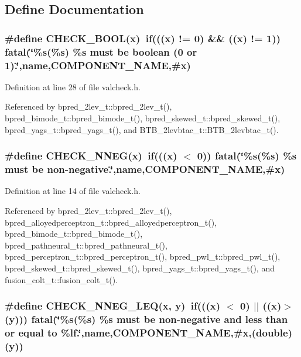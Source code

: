 \subsection{Define Documentation}
\subsubsection[{CHECK\_\-BOOL}]{\setlength{\rightskip}{0pt plus 5cm}\#define CHECK\_\-BOOL(x)~if(((x) != 0) \&\& ((x) != 1)) fatal(\char`\"{}\%s(\%{\bf s}) \%{\bf s} must be boolean (0 or 1).\char`\"{},name,COMPONENT\_\-NAME,\#x)}\label{valcheck_8h_e4da23c2826590bf3f9a30631991112a}




Definition at line 28 of file valcheck.h.

Referenced by bpred\_\-2lev\_\-t::bpred\_\-2lev\_\-t(), bpred\_\-bimode\_\-t::bpred\_\-bimode\_\-t(), bpred\_\-skewed\_\-t::bpred\_\-skewed\_\-t(), bpred\_\-yags\_\-t::bpred\_\-yags\_\-t(), and BTB\_\-2levbtac\_\-t::BTB\_\-2levbtac\_\-t().
\subsubsection[{CHECK\_\-NNEG}]{\setlength{\rightskip}{0pt plus 5cm}\#define CHECK\_\-NNEG(x)~if(((x) $<$ 0)) fatal(\char`\"{}\%s(\%{\bf s}) \%{\bf s} must be non-negative.\char`\"{},name,COMPONENT\_\-NAME,\#x)}\label{valcheck_8h_add41af8cea1e110db7000fd5b0fb871}




Definition at line 14 of file valcheck.h.

Referenced by bpred\_\-2lev\_\-t::bpred\_\-2lev\_\-t(), bpred\_\-alloyedperceptron\_\-t::bpred\_\-alloyedperceptron\_\-t(), bpred\_\-bimode\_\-t::bpred\_\-bimode\_\-t(), bpred\_\-pathneural\_\-t::bpred\_\-pathneural\_\-t(), bpred\_\-perceptron\_\-t::bpred\_\-perceptron\_\-t(), bpred\_\-pwl\_\-t::bpred\_\-pwl\_\-t(), bpred\_\-skewed\_\-t::bpred\_\-skewed\_\-t(), bpred\_\-yags\_\-t::bpred\_\-yags\_\-t(), and fusion\_\-colt\_\-t::fusion\_\-colt\_\-t().
\subsubsection[{CHECK\_\-NNEG\_\-LEQ}]{\setlength{\rightskip}{0pt plus 5cm}\#define CHECK\_\-NNEG\_\-LEQ(x, \/  y)~if(((x) $<$ 0) $|$$|$ ((x)$>$(y))) fatal(\char`\"{}\%s(\%{\bf s}) \%{\bf s} must be non-negative and less than or equal to \%lf.\char`\"{},name,COMPONENT\_\-NAME,\#x,(double)(y))}\label{valcheck_8h_dd6e150b6027f40ba3794f4ce8436f0e}





